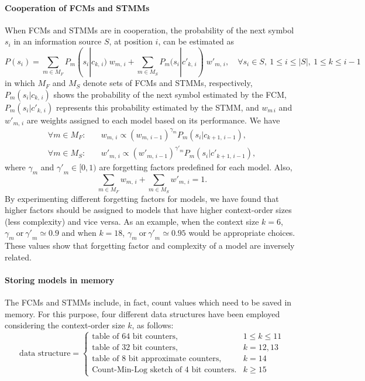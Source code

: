 \paragraph{Cooperation of FCMs and STMMs}
When FCMs and STMMs are in cooperation, the probability of the next symbol $s_i$ in an information source $S$, at position $i$, can be estimated as
\begin{equation}
  \label{eq.coop}
P(s_i) = \sum_{m\in M_F} P_m(s_i|c_{k,\,i})\;w_{m,\,i} + \sum_{m\in M_S} P_m(s_i|{c'}_{k,\,i})\;{w'}_{m,\,i}, \quad\forall s_i\in S,~1\le i\le |S|,~1\le k\le i-1
\end{equation}
in which $M_F$ and $M_S$ denote sets of FCMs and STMMs, respectively, $P_m(s_i|c_{k,\,i})$ shows the probability of the next symbol estimated by the FCM, $P_m(s_i|{c'}_{k,\,i})$ represents this probability estimated by the STMM, and $w_{m\,i}$ and ${w'}_{m,\,i}$ are weights assigned to each model based on its performance. We have
\begin{align}
\forall m\in M_F: \quad &w_{m,\,i} \propto (w_{m,\,i-1})^{\gamma_m} P_m(s_i|c_{k+1,\,i-1}),
\nonumber
\\[1mm]
\forall m\in M_S: \quad &{w'}_{m,\,i} \propto ({w'}_{m,\,i-1})^{{\gamma'}_m} P_m(s_i|{c'}_{k+1,\,i-1}),
\end{align}
where $\gamma_m$ and ${\gamma'}_m \in [0,1)$ are forgetting factors predefined for each model. Also,
\begin{equation}
\sum_{m\in M_F} w_{m,\,i} + \sum_{m\in M_S} {w'}_{m,\,i} = 1.
\end{equation}
By experimenting different forgetting factors for models, we have found that higher factors should be assigned to models that have higher context-order sizes (less complexity) and vice versa. As an example, when the context size $k=6$, $\gamma_m~\mathrm{or}~{\gamma'}_m \simeq 0.9$ and when $k=18$, $\gamma_m~\mathrm{or}~{\gamma'}_m \simeq 0.95$ would be appropriate choices. These values show that forgetting factor and complexity of a model are inversely related.

\paragraph{Storing models in memory}
The FCMs and STMMs include, in fact, count values which need to be saved in memory. For this purpose, four different data structures have been employed considering the context-order size $k$, as follows:
\begin{equation*}
  \textrm{data structure} =
\begin{cases}
  \textrm{table of 64 bit counters}, & 1 \leq k \leq 11 \\
  \textrm{table of 32 bit counters}, & k=12, 13 \\
  \textrm{table of 8 bit approximate counters}, & k=14 \\
  \textrm{Count-Min-Log sketch of 4 bit counters}. & k \ge 15
\end{cases}
\end{equation*}

